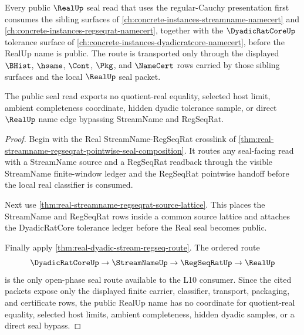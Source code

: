 \begin{theorem}
\label{thm:real-regseqrat-streamname-sibling-route}
Every public $\RealUp$ seal read that uses the regular-Cauchy presentation first consumes the sibling surfaces of \autoref{ch:concrete-instances-streamname-namecert} and \autoref{ch:concrete-instances-regseqrat-namecert}, together with the $\DyadicRatCoreUp$ tolerance surface of \autoref{ch:concrete-instances-dyadicratcore-namecert}, before the RealUp name is public. The route is transported only through the displayed $\BHist$, $\hsame$, $\Cont$, $\Pkg$, and $\NameCert$ rows carried by those sibling surfaces and the local $\RealUp$ seal packet.

The public seal read exports no quotient-real equality, selected host limit, ambient completeness coordinate, hidden dyadic tolerance sample, or direct $\RealUp$ name edge bypassing StreamName and RegSeqRat.
\end{theorem}
\begin{proof}
Begin with the Real StreamName-RegSeqRat crosslink of \autoref{thm:real-streamname-regseqrat-pointwise-seal-composition}. It routes any seal-facing read with a StreamName source and a RegSeqRat readback through the visible StreamName finite-window ledger and the RegSeqRat pointwise handoff before the local real classifier is consumed.

Next use \autoref{thm:real-streamname-regseqrat-source-lattice}. This places the StreamName and RegSeqRat rows inside a common source lattice and attaches the DyadicRatCore tolerance ledger before the Real seal becomes public.

Finally apply \autoref{thm:real-dyadic-stream-regseq-route}. The ordered route
$$
\DyadicRatCoreUp \to \StreamNameUp \to \RegSeqRatUp \to \RealUp
$$
is the only open-phase seal route available to the L10 consumer. Since the cited packets expose only the displayed finite carrier, classifier, transport, packaging, and certificate rows, the public RealUp name has no coordinate for quotient-real equality, selected host limits, ambient completeness, hidden dyadic samples, or a direct seal bypass.
\end{proof}
